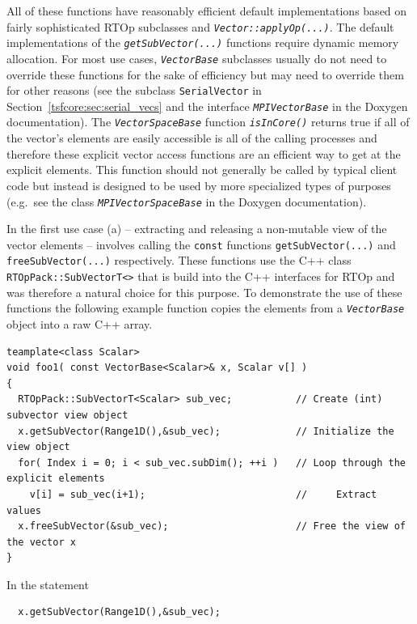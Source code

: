 \documentclass[pdf,ps2pdf,11pt]{SANDreport}
\begin{document}
{}\noindent{}All of these functions have reasonably efficient default
implementations based on fairly sophisticated RTOp subclasses and
{}\texttt{\textit{Vector::applyOp(\-...)}}.  The default implementations of
the {}\texttt{\textit{getSubVector(...)}} functions require dynamic memory
allocation.  For most use cases, {}\texttt{\textit{Vector\-Base}} subclasses
usually do not need to override these functions for the sake of efficiency but
may need to override them for other reasons (see the subclass
{}\texttt{SerialVector} in Section~\ref{tsfcore:sec:serial_vecs} and the
interface {}\texttt{\textit{MPI\-Vector\-Base}} in the Doxygen documentation).
The {}\texttt{\textit{Vector\-Space\-Base}} function
{}\texttt{\textit{isInCore()}} returns true if all of the vector's elements
are easily accessible is all of the calling processes and therefore these
explicit vector access functions are an efficient way to get at the explicit
elements.  This function should not generally be called by typical client code
but instead is designed to be used by more specialized types of purposes
(e.g.~see the class {}\texttt{\textit{MPI\-Vector\-Space\-Base}} in the
Doxygen documentation).

In the first use case (a) -- extracting and releasing a non-mutable
view of the vector elements -- involves calling the {}\texttt{const}
functions {}\texttt{get\-Sub\-Vector(...)} and
{}\texttt{free\-Sub\-Vector(...)}  respectively.  These functions use
the C++ class {}\texttt{RTOp\-Pack::\-Sub\-VectorT<>} that is build
into the C++ interfaces for RTOp and was therefore a natural choice
for this purpose.  To demonstrate the use of these functions the
following example function copies the elements from a
{}\texttt{\textit{Vector\-Base}} object into a raw C++ array.

{\scriptsize\begin{verbatim}
teamplate<class Scalar>
void foo1( const VectorBase<Scalar>& x, Scalar v[] )
{
  RTOpPack::SubVectorT<Scalar> sub_vec;           // Create (int) subvector view object
  x.getSubVector(Range1D(),&sub_vec);             // Initialize the view object
  for( Index i = 0; i < sub_vec.subDim(); ++i )   // Loop through the explicit elements
    v[i] = sub_vec(i+1);                          //     Extract values
  x.freeSubVector(&sub_vec);                      // Free the view of the vector x
}
\end{verbatim}}

{}\noindent{}In the statement

{\scriptsize\begin{verbatim}
  x.getSubVector(Range1D(),&sub_vec);
\end{verbatim}}
\end{document}
